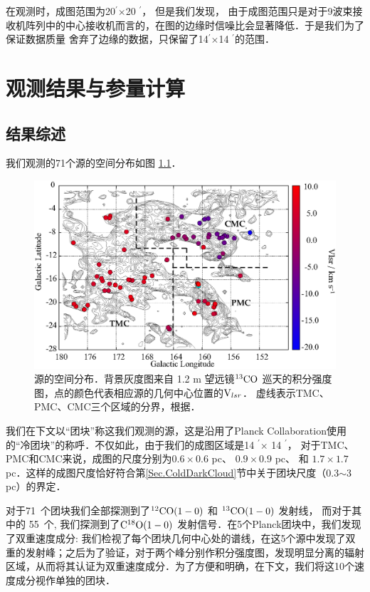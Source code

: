 \documentclass[UTF8, nocolorlinks]{pkuthss}
\newcommand{\cob}{$\rm ^{13}CO$ }
\newcommand{\coaa}{$\rm^{12}CO(1-0)$ }
\newcommand{\cobb}{$\rm^{13}CO(1-0)$ }
\newcommand{\cocc}{$\rm C^{18}O(1-0)$ }
\newcommand{\multi}{$\times$}
\newcommand{\vlsr}{${\rm V } _{lsr}$}
\newcommand{\arcmin}{$^{\prime}$}
\newcommand{\numsou}{71\ }
\newcommand{\numcocc}{55\ }
\begin{document}
        在观测时，成图范围为20\arcmin \multi 20 \arcmin ， 但是我们发现， 由于成图范围只是对于9波束接收机阵列中的中心接收机而言的，在图的边缘时信噪比会显著降低．于是我们为了保证数据质量 舍弃了边缘的数据，只保留了14\arcmin \multi 14 \arcmin 的范围．

\chapter{观测结果与参量计算}

	\section{结果综述}

		我们观测的71个源的空间分布如图 \ref{Fig.SpatialDistribution}．

		\begin{figure}[H]
			\centering
			\includegraphics[totalheight=82mm]{img_plot/SpatiaDist_Velocity_Overlay.eps}
			\caption{\small 源的空间分布．背景灰度图来自 1.2 m 望远镜\cob 巡天的积分强度图\supercite{2001ApJ...547..792D}，点的颜色代表相应源的几何中心位置的\vlsr ．
			虚线表示TMC、PMC、CMC三个区域的分界，根据\parencite{2010A&A...512A..67L}．
			\label{Fig.SpatialDistribution}}
		\end{figure}

		我们在下文以“团块”称这我们观测的源，这是沿用了Planck Collaboration使用的“冷团块”的称呼\supercite{2011A&A...536A..23P}．不仅如此，由于我们的成图区域是14 \arcmin $\times$ 14 \arcmin ， 对于TMC、PMC和CMC来说，成图的尺度分别为$0.6\times0.6$ pc、 $0.9\times0.9$ pc、 和 $1.7\times1.7$ pc．这样的成图尺度恰好符合第\ref{Sec.ColdDarkCloud}节中关于团块尺度（0.3$\sim$3 pc）的界定．

		对于\numsou 个团块我们全部探测到了\coaa  和 \cobb 发射线， 而对于其中的 \numcocc 个, 我们探测到了\cocc 发射信号．在5个Planck团块中，我们发现了双重速度成分: 我们检视了每个团块几何中心处的谱线，在这5个源中发现了双重的发射峰；之后为了验证，对于两个峰分别作积分强度图，发现明显分离的辐射区域，从而将其认证为双重速度成分．为了方便和明确，在下文，我们将这10个速度成分视作单独的团块．
	
\end{document}
